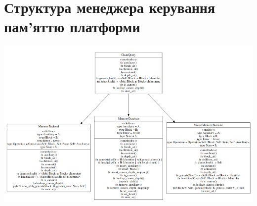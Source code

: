 \documentclass[a4paper]{report}
\begin{document}
\section*{Структура менеджера керування пам'яттю  платформи}
\includegraphics[angle=90,width=1\textwidth, height=1.45\textwidth]{mem_manager}
\newpage
\end{document}
